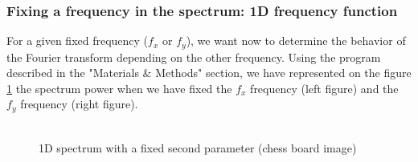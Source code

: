 \documentclass[a4paper]{article}
\begin{document}
		\subsubsection{Fixing a frequency in the spectrum: 1D frequency function}
        For a given fixed frequency ($f_{x}$ or $f_{y}$), we want now to determine the behavior of the Fourier transform depending on the other frequency.   Using the program described in the "Materials \& Methods" section, we have represented on the figure \ref{fixedFrequency.pgm} the spectrum power when we have fixed the $f_{x}$ frequency (left figure) and the $f_{y}$ frequency (right figure).\\\\
         \begin{figure}[h!]\centering
             \begin{minipage}{0.45\textwidth}  \end{minipage}
             \begin{minipage}{0.45\textwidth}  \end{minipage}
             \caption{1D spectrum with a fixed second parameter (chess board image)}
             \label{fixedFrequency.pgm}
         \end{figure}
\end{document}

